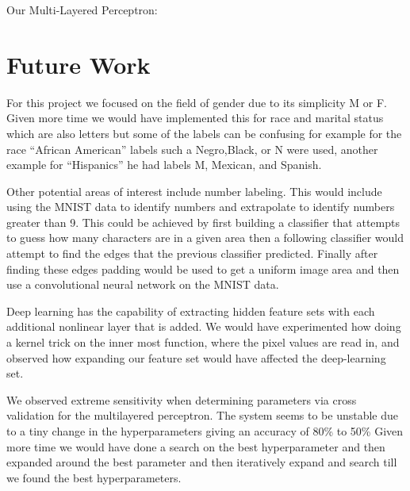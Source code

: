 \documentclass[11pt]{article}
\begin{document}
Our Multi-Layered Perceptron:

\section{Future Work}
For this project we focused on the field of gender due to its simplicity M or F.  Given more time we would have implemented this for race and marital status which are also letters but some of the labels can be confusing for example for the race “African American” labels such a Negro,Black, or N were used, another example for “Hispanics” he had labels M, Mexican, and Spanish.

Other potential areas of interest include number labeling.  This would include using the MNIST data to identify numbers and extrapolate to identify numbers greater than 9.  This could be achieved by first building a classifier that attempts to guess how many characters are in a given area then a following classifier would attempt to find the edges that the previous classifier predicted.  Finally after finding these edges padding would be used to get a uniform image area and then use a convolutional neural network on the MNIST data.

Deep learning has the capability of extracting hidden feature sets with each additional nonlinear layer that is added.  We would have experimented how doing a kernel trick on the inner most function, where the pixel values are read in, and observed how expanding our feature set would have affected the deep-learning set.

We observed extreme sensitivity when determining parameters via cross validation for the multilayered perceptron.  The system seems to be unstable due to a tiny change in the hyperparameters giving an accuracy of 80\% to 50\%  Given more time we would have done a search on the best hyperparameter and then expanded around the best parameter and then iteratively expand and search till we found the best hyperparameters.
\end{document}
